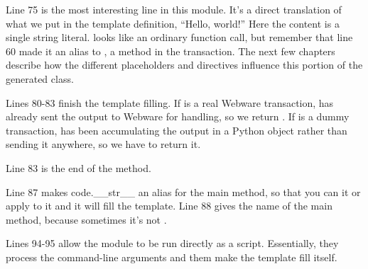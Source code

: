 Line 75 is the most interesting line in this module.  It's a direct
translation of what we put in the template definition, ``Hello, world!'' Here
the content is a single string literal.   looks like an ordinary
function call, but remember that line 60 made it an alias to
, a method in the transaction.  The next few
chapters describe how the different placeholders and directives influence this
portion of the generated class.

Lines 80-83 finish the template filling.  If  is a real Webware
transaction,  has already sent the output to Webware for handling,
so we return .  If  is a dummy transaction, 
 has been accumulating the output in a Python 
object rather than sending it anywhere, so we have to return it.

Line 83 is the end of the  method.

Line 87 makes code{.\_\_str\_\_} an alias for the main method, so that you
can  it or apply  to it and it will fill the template.
Line 88 gives the name of the main method, because sometimes it's not
.  

Lines 94-95 allow the module to be run directly as a script.  Essentially,
they process the command-line arguments and them make the template fill
itself.


